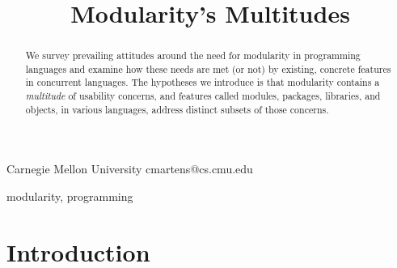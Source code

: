 \documentclass{sigplanconf}[10pt]
\begin{document}
\setlength{\pdfpageheight}{\paperheight}
\setlength{\pdfpagewidth}{\paperwidth}






\title{Modularity's Multitudes}

           {Carnegie Mellon University}
           {cmartens@cs.cmu.edu}

\maketitle

\begin{abstract}
We survey prevailing attitudes around the need for modularity in
programming languages and examine how these needs are met (or not) by
existing, concrete features in concurrent languages. The hypotheses we introduce
is that modularity contains a {\em multitude} of usability concerns,
and features called modules, packages, libraries, and objects, in various
languages, address distinct subsets of those concerns. 
\end{abstract}



\keywords
modularity, programming

\section{Introduction}
\end{document}
